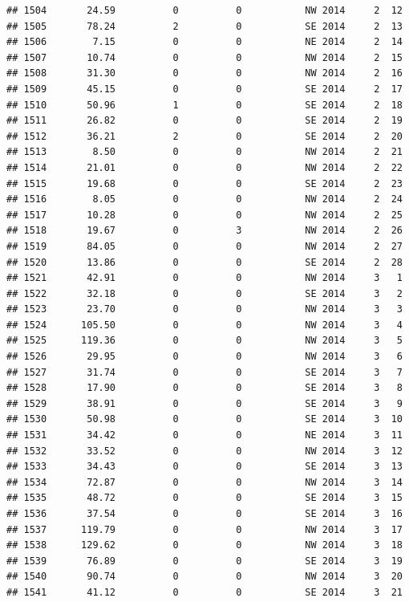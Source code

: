 \documentclass[
]{article}
\begin{document}
\begin{verbatim}
## 1504       24.59          0          0           NW 2014     2  12
## 1505       78.24          2          0           SE 2014     2  13
## 1506        7.15          0          0           NE 2014     2  14
## 1507       10.74          0          0           NW 2014     2  15
## 1508       31.30          0          0           NW 2014     2  16
## 1509       45.15          0          0           SE 2014     2  17
## 1510       50.96          1          0           SE 2014     2  18
## 1511       26.82          0          0           SE 2014     2  19
## 1512       36.21          2          0           SE 2014     2  20
## 1513        8.50          0          0           NW 2014     2  21
## 1514       21.01          0          0           NW 2014     2  22
## 1515       19.68          0          0           SE 2014     2  23
## 1516        8.05          0          0           NW 2014     2  24
## 1517       10.28          0          0           NW 2014     2  25
## 1518       19.67          0          3           NW 2014     2  26
## 1519       84.05          0          0           NW 2014     2  27
## 1520       13.86          0          0           SE 2014     2  28
## 1521       42.91          0          0           NW 2014     3   1
## 1522       32.18          0          0           SE 2014     3   2
## 1523       23.70          0          0           NW 2014     3   3
## 1524      105.50          0          0           NW 2014     3   4
## 1525      119.36          0          0           NW 2014     3   5
## 1526       29.95          0          0           NW 2014     3   6
## 1527       31.74          0          0           SE 2014     3   7
## 1528       17.90          0          0           SE 2014     3   8
## 1529       38.91          0          0           SE 2014     3   9
## 1530       50.98          0          0           SE 2014     3  10
## 1531       34.42          0          0           NE 2014     3  11
## 1532       33.52          0          0           NW 2014     3  12
## 1533       34.43          0          0           SE 2014     3  13
## 1534       72.87          0          0           NW 2014     3  14
## 1535       48.72          0          0           SE 2014     3  15
## 1536       37.54          0          0           SE 2014     3  16
## 1537      119.79          0          0           NW 2014     3  17
## 1538      129.62          0          0           NW 2014     3  18
## 1539       76.89          0          0           SE 2014     3  19
## 1540       90.74          0          0           NW 2014     3  20
## 1541       41.12          0          0           SE 2014     3  21

\end{verbatim}
\end{document}
